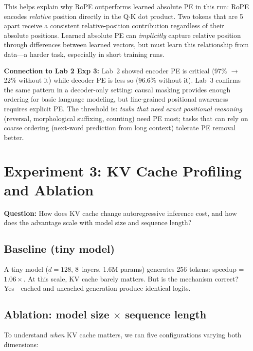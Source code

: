 This helps explain why RoPE outperforms learned absolute PE in this run: RoPE encodes \emph{relative} position directly in the Q$\cdot$K dot product. Two tokens that are 5 apart receive a consistent relative-position contribution regardless of their absolute positions. Learned absolute PE can \emph{implicitly} capture relative position through differences between learned vectors, but must learn this relationship from data---a harder task, especially in short training runs.

\textbf{Connection to Lab 2 Exp 3:} Lab~2 showed encoder PE is critical (97\% $\to$ 22\% without it) while decoder PE is less so (96.6\% without it). Lab~3 confirms the same pattern in a decoder-only setting: causal masking provides enough ordering for basic language modeling, but fine-grained positional awareness requires explicit PE. The threshold is: \emph{tasks that need exact positional reasoning} (reversal, morphological suffixing, counting) need PE most; tasks that can rely on coarse ordering (next-word prediction from long context) tolerate PE removal better.

\section{Experiment 3: KV Cache Profiling and Ablation}

\textbf{Question:} How does KV cache change autoregressive inference cost, and how does the advantage scale with model size and sequence length?

\subsection*{Baseline (tiny model)}

A tiny model ($d=128$, 8~layers, 1.6M params) generates 256 tokens: speedup = $1.06\times$. At this scale, KV cache barely matters. But is the mechanism correct? Yes---cached and uncached generation produce identical logits.

\subsection*{Ablation: model size $\times$ sequence length}

To understand \emph{when} KV cache matters, we ran five configurations varying both dimensions:


